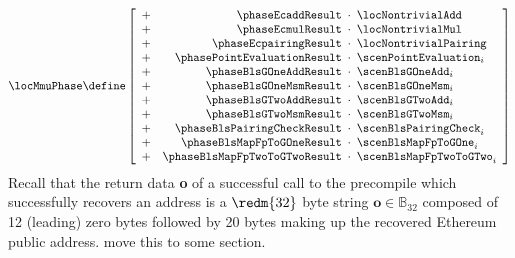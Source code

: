 \begin{description}
\begin{description}
				\[
					\locMmuPhase \define
					\left[ \begin{array}{crclcl}
						+ & \phaseEcaddResult             & \!\!\!\cdot\!\!\! & \locNontrivialAdd            \\
						+ & \phaseEcmulResult             & \!\!\!\cdot\!\!\! & \locNontrivialMul            \\
						+ & \phaseEcpairingResult         & \!\!\!\cdot\!\!\! & \locNontrivialPairing        \\
						+ & \phasePointEvaluationResult   & \!\!\!\cdot\!\!\! & \scenPointEvaluation    _{i} \\
						+ & \phaseBlsGOneAddResult        & \!\!\!\cdot\!\!\! & \scenBlsGOneAdd         _{i} \\
						+ & \phaseBlsGOneMsmResult        & \!\!\!\cdot\!\!\! & \scenBlsGOneMsm         _{i} \\
						+ & \phaseBlsGTwoAddResult        & \!\!\!\cdot\!\!\! & \scenBlsGTwoAdd         _{i} \\
						+ & \phaseBlsGTwoMsmResult        & \!\!\!\cdot\!\!\! & \scenBlsGTwoMsm         _{i} \\
						+ & \phaseBlsPairingCheckResult   & \!\!\!\cdot\!\!\! & \scenBlsPairingCheck    _{i} \\
						+ & \phaseBlsMapFpToGOneResult    & \!\!\!\cdot\!\!\! & \scenBlsMapFpToGOne     _{i} \\
						+ & \phaseBlsMapFpTwoToGTwoResult & \!\!\!\cdot\!\!\! & \scenBlsMapFpTwoToGTwo  _{i} \\
					\end{array} \right]
				\]
				\saNote{}
				Recall that the return data \textbf{o} of a successful call to the
				\instEcrecover{}
				precompile which successfully recovers an address
				is a $\redm{32}$ byte string $\textbf{o} \in \mathbb{B}_{32}$
				composed of 12 (leading) zero bytes followed by 20 bytes making up the recovered Ethereum public address.
				\specTodo{} move this to some \instEcrecover{} section.


\end{description}
\end{description}
